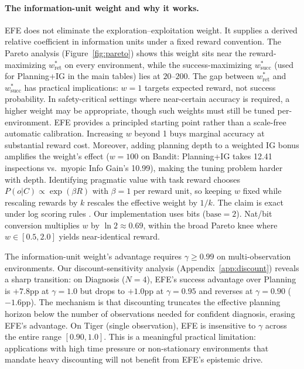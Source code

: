 \documentclass[runningheads]{llncs}
\begin{document}
\paragraph{The information-unit weight and why it works.}
EFE does not eliminate the exploration--exploitation weight. It supplies a derived relative coefficient in information units under a fixed reward convention. The Pareto analysis (Figure~\ref{fig:pareto}) shows this weight sits near the reward-maximizing $w^*_{\text{ret}}$ on every environment, while the success-maximizing $w^*_{\text{succ}}$ (used for Planning+IG in the main tables) lies at $20$--$200$. The gap between $w^*_{\text{ret}}$ and $w^*_{\text{succ}}$ has practical implications: $w{=}1$ targets expected reward, not success probability. In safety-critical settings where near-certain accuracy is required, a higher weight may be appropriate, though such weights must still be tuned per-environment. EFE provides a principled starting point rather than a scale-free automatic calibration. Increasing $w$ beyond 1 buys marginal accuracy at substantial reward cost. Moreover, adding planning depth to a weighted IG bonus amplifies the weight's effect ($w{=}100$ on Bandit: Planning+IG takes 12.41 inspections vs.\ myopic Info Gain's 10.99), making the tuning problem harder with depth. Identifying pragmatic value with task reward chooses $P(o|C) \propto \exp(\beta R)$ with $\beta{=}1$ per reward unit, so keeping $w$ fixed while rescaling rewards by $k$ rescales the effective weight by $1/k$. The claim is exact under log scoring rules \citep{bernardo1979}. Our implementation uses bits ($\mathrm{base}{=}2$). Nat/bit conversion multiplies $w$ by $\ln 2 \approx 0.69$, within the broad Pareto knee where $w \in [0.5, 2.0]$ yields near-identical reward.

The information-unit weight's advantage requires $\gamma \geq 0.99$ on multi-observation environments. Our discount-sensitivity analysis (Appendix~\ref{app:discount}) reveals a sharp transition: on Diagnosis ($N{=}4$), EFE's success advantage over Planning is $+7.8$pp at $\gamma{=}1.0$ but drops to $+1.0$pp at $\gamma{=}0.95$ and reverses at $\gamma{=}0.90$ ($-1.6$pp). The mechanism is that discounting truncates the effective planning horizon below the number of observations needed for confident diagnosis, erasing EFE's advantage. On Tiger (single observation), EFE is insensitive to $\gamma$ across the entire range $[0.90, 1.0]$. This is a meaningful practical limitation: applications with high time pressure or non-stationary environments that mandate heavy discounting will not benefit from EFE's epistemic drive.
\end{document}
